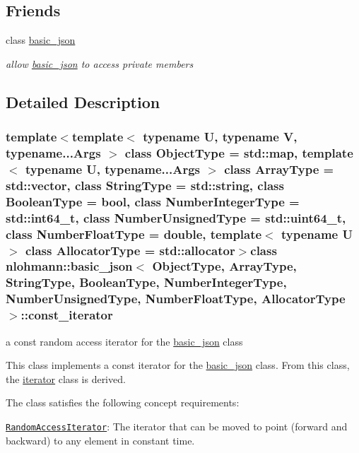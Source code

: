 \subsection*{Friends}
\begin{DoxyCompactItemize}
\item 
class \hyperlink{classnlohmann_1_1basic__json_1_1const__iterator_a069a4f73a702f4c2bc0d14ca1565a7b0}{basic\-\_\-json}
\begin{DoxyCompactList}\small\item\em allow \hyperlink{classnlohmann_1_1basic__json}{basic\-\_\-json} to access private members \end{DoxyCompactList}\end{DoxyCompactItemize}


\subsection{Detailed Description}
\subsubsection*{template$<$template$<$ typename U, typename V, typename...\-Args $>$ class Object\-Type = std\-::map, template$<$ typename U, typename...\-Args $>$ class Array\-Type = std\-::vector, class String\-Type = std\-::string, class Boolean\-Type = bool, class Number\-Integer\-Type = std\-::int64\-\_\-t, class Number\-Unsigned\-Type = std\-::uint64\-\_\-t, class Number\-Float\-Type = double, template$<$ typename U $>$ class Allocator\-Type = std\-::allocator$>$class nlohmann\-::basic\-\_\-json$<$ Object\-Type, Array\-Type, String\-Type, Boolean\-Type, Number\-Integer\-Type, Number\-Unsigned\-Type, Number\-Float\-Type, Allocator\-Type $>$\-::const\-\_\-iterator}

a const random access iterator for the \hyperlink{classnlohmann_1_1basic__json}{basic\-\_\-json} class 

This class implements a const iterator for the \hyperlink{classnlohmann_1_1basic__json}{basic\-\_\-json} class. From this class, the \hyperlink{classnlohmann_1_1basic__json_1_1iterator}{iterator} class is derived.

The class satisfies the following concept requirements\-:
\begin{DoxyItemize}
\item \href{http://en.cppreference.com/w/cpp/concept/RandomAccessIterator}{\tt Random\-Access\-Iterator}\-: The iterator that can be moved to point (forward and backward) to any element in constant time.
\end{DoxyItemize}

